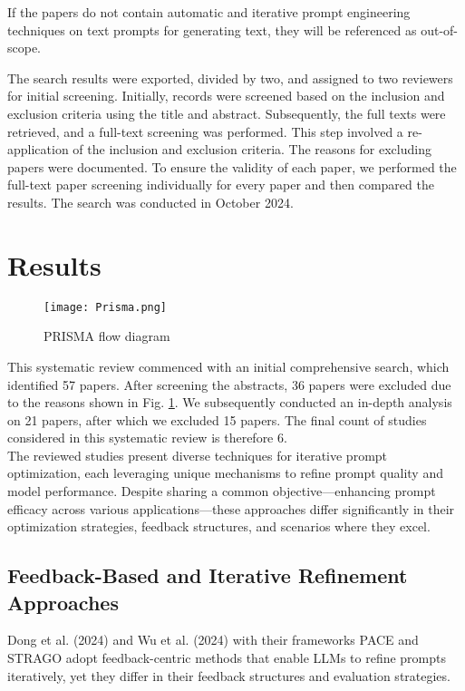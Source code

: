 \documentclass[runningheads]{llncs}
\begin{document}
If the papers do not contain automatic and iterative prompt engineering techniques on text prompts for generating text, they will be referenced as out-of-scope. 

The search results were exported, divided by two, and assigned to two reviewers for initial screening. Initially, records were screened based on the inclusion and exclusion criteria using the title and abstract. Subsequently, the full texts were retrieved, and a full-text screening was performed. This step involved a re-application of the inclusion and exclusion criteria. The reasons for excluding papers were documented.
To ensure the validity of each paper, we performed the full-text paper screening individually for every paper and then compared the results. The search was conducted in October 2024.

\section{Results}
\label{sec:results}

\begin{figure}[t]
\centering
\texttt{[image: Prisma.png]}
    \caption{PRISMA flow diagram}
    \label{fig:flowdiagram}
\end{figure}

This systematic review commenced with an initial comprehensive search, which identified 57 papers. After screening the abstracts, 36 papers were excluded due to the reasons shown in Fig. \ref{fig:flowdiagram}. We subsequently conducted an in-depth analysis on 21 papers, after which we excluded 15 papers. The final count of studies considered in this systematic review is therefore 6. \\

The reviewed studies present diverse techniques for iterative prompt optimization, each leveraging unique mechanisms to refine prompt quality and model performance. Despite sharing a common objective—enhancing prompt efficacy across various applications—these approaches differ significantly in their optimization strategies, feedback structures, and scenarios where they excel.

\subsection{Feedback-Based and Iterative Refinement Approaches}

Dong et al. (2024) \cite{dong2024paceimprovingpromptactorcritic} and Wu et al. (2024) \cite{wu2024stragoharnessingstrategicguidance}  with their frameworks PACE and STRAGO adopt feedback-centric methods that enable LLMs to refine prompts iteratively, yet they differ in their feedback structures and evaluation strategies.
\end{document}
